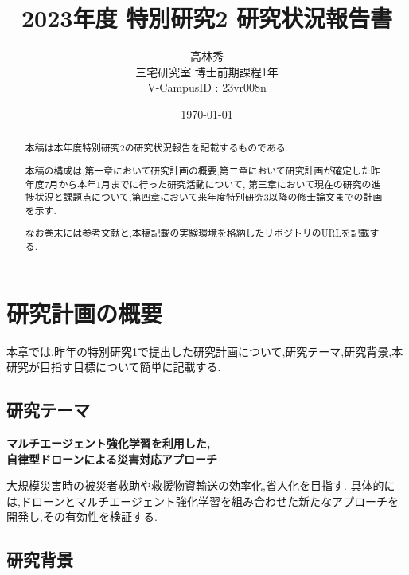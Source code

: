 \documentclass{article}[jsarticle]
\title{2023年度 特別研究2 研究状況報告書}
\author{高林秀 \\ 三宅研究室 博士前期課程1年 \\ V-CampusID : 23vr008n}
\date{\today}
\begin{document}
\maketitle

\begin{abstract}
    本稿は本年度特別研究2の研究状況報告を記載するものである.\par
    本稿の構成は,第一章において研究計画の概要,第二章において研究計画が確定した昨年度7月から本年1月までに行った研究活動について,
    第三章において現在の研究の進捗状況と課題点について,第四章において来年度特別研究3以降の修士論文までの計画を示す.\par 
    なお巻末には参考文献と,本稿記載の実験環境を格納したリポジトリのURLを記載する.
\end{abstract}



\tableofcontents


\section{研究計画の概要}
本章では,昨年の特別研究1で提出した研究計画について,研究テーマ,研究背景,本研究が目指す目標について簡単に記載する.
\subsection{研究テーマ}
    \centerline{
        \textbf{マルチエージェント強化学習を利用した,} \\
        \textbf{自律型ドローンによる災害対応アプローチ}
    }
    大規模災害時の被災者救助や救援物資輸送の効率化,省人化を目指す.
    具体的には,ドローンとマルチエージェント強化学習を組み合わせた新たなアプローチを開発し,その有効性を検証する.
\subsection{研究背景}
\end{document}
